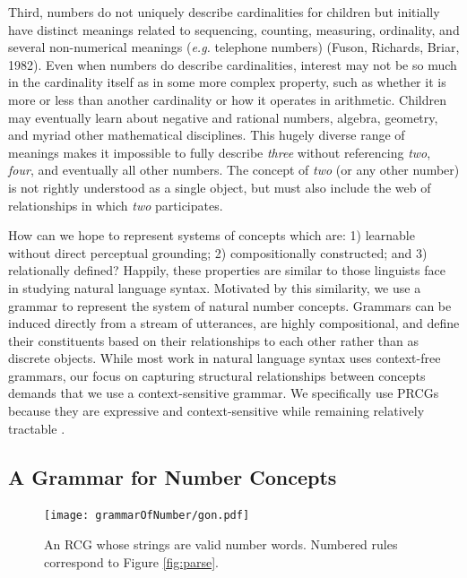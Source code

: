 \documentclass[10pt,letterpaper]{article}
\begin{document}
Third, numbers do not uniquely describe cardinalities for children but
initially have distinct meanings related to sequencing, counting,
measuring, ordinality, and several non-numerical meanings ({\it e.g.}
telephone numbers) (Fuson, Richards, Briar, 1982). Even when numbers
do describe cardinalities, interest may not be so much in the
cardinality itself as in some more complex property, such as whether
it is more or less than another cardinality or how it operates
in arithmetic. Children may eventually learn about negative
and rational numbers, algebra, geometry, and myriad other mathematical
disciplines. This hugely diverse range of meanings makes it impossible
to fully describe \emph{three} without referencing \emph{two},
\emph{four}, and eventually all other numbers. The concept of
\emph{two} (or any other number) is not rightly understood as a single
object, but must also include the web of relationships in which
\emph{two} participates.

How can we hope to represent systems of concepts which are: 1)
learnable without direct perceptual grounding; 2) compositionally
constructed; and 3) relationally defined? Happily, these properties
are similar to those linguists face in studying natural language
syntax. Motivated by this similarity, we use a grammar to represent
the system of natural number concepts. Grammars can be induced
directly from a stream of utterances, are highly compositional, and
define their constituents based on their relationships to each other
rather than as discrete objects. While most work in natural language
syntax uses context-free grammars, our focus on capturing structural
relationships between concepts demands that we use a context-sensitive
grammar. We specifically use PRCGs because they are expressive and
context-sensitive while remaining relatively tractable
\citep{boullier2005range}.

\subsection{A Grammar for Number Concepts}

\begin{figure}[t]
  \begin{centering}
    \texttt{[image: grammarOfNumber/gon.pdf]}
    \caption{An RCG whose strings are valid number words. Numbered rules correspond to Figure \ref{fig:parse}.}
    \label{fig:gon}
  \end{centering}
\end{figure}
\end{document}
